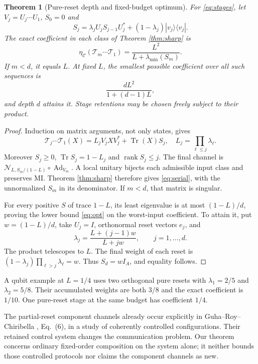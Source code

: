 \documentclass[11pt]{article}
\newtheorem{theorem}{Theorem}
\newcommand{\Tr}{\operatorname{Tr}}
\newcommand{\Ad}{\operatorname{Ad}}
\newcommand{\ket}[1]{|#1\rangle}
\newcommand{\bra}[1]{\langle#1|}
\DeclareMathOperator{\rank}{rank}
\begin{document}
\begin{theorem}[Pure-reset depth and fixed-budget optimum]\label{thm:depth}
For \eqref{eq:stages}, let $V_j=U_j\cdots U_1$, $S_0=0$ and
\[
 S_j=\lambda_j U_jS_{j-1}U_j^*+(1-\lambda_j)\ket{v_j}\bra{v_j}.
\]
The exact coefficient in each class of Theorem \ref{thm:sharp} is
\begin{equation}\label{eq:serial}
 \eta_{\mathcal C}(\mathcal T_m\cdots\mathcal T_1)
 =\frac{L^2}{L+\lambda_{\min}(S_m)}.
\end{equation}
If $m<d$, it equals $L$. At fixed $L$, the smallest possible coefficient over all such sequences is
\begin{equation}\label{eq:opt}
 \frac{dL^2}{1+(d-1)L},
\end{equation}
and depth $d$ attains it. Stage retentions may be chosen freely subject to their product.
\end{theorem}
\begin{proof}
Induction on matrix arguments, not only states, gives
\[
 \mathcal T_j\cdots\mathcal T_1(X)=L_jV_jXV_j^*+\Tr(X)S_j,
 \quad L_j=\prod_{\ell\le j}\lambda_\ell.
\]
Moreover $S_j\ge0$, $\Tr S_j=1-L_j$ and $\rank S_j\le j$. The final channel is $\mathcal N_{L,S_m/(1-L)}\circ\Ad_{V_m}$. A local unitary bijects each admissible input class and preserves MI. Theorem \ref{thm:sharp} therefore gives \eqref{eq:serial}, with the unnormalized $S_m$ in its denominator. If $m<d$, that matrix is singular.

For every positive $S$ of trace $1-L$, its least eigenvalue is at most $(1-L)/d$, proving the lower bound \eqref{eq:opt} on the worst-input coefficient. To attain it, put $w=(1-L)/d$, take $U_j=I$, orthonormal reset vectors $e_j$, and
\[
 \lambda_j=\frac{L+(j-1)w}{L+jw},\qquad j=1,\ldots,d.
\]
The product telescopes to $L$. The final weight of each reset is
$(1-\lambda_j)\prod_{\ell>j}\lambda_\ell=w$. Thus $S_d=wI_A$, and equality follows.
\end{proof}

A qubit example at $L=1/4$ uses two orthogonal pure resets with $\lambda_1=2/5$ and $\lambda_2=5/8$. Their accumulated weights are both $3/8$ and the exact coefficient is $1/10$. One pure-reset stage at the same budget has coefficient $1/4$.

The partial-reset component channels already occur explicitly in Guha--Roy--Chiribella \cite{guha}, Eq.~(6), in a study of coherently controlled configurations. Their retained control system changes the communication problem. Our theorem concerns ordinary fixed-order composition on the system alone; it neither bounds those controlled protocols nor claims the component channels as new.
\end{document}
